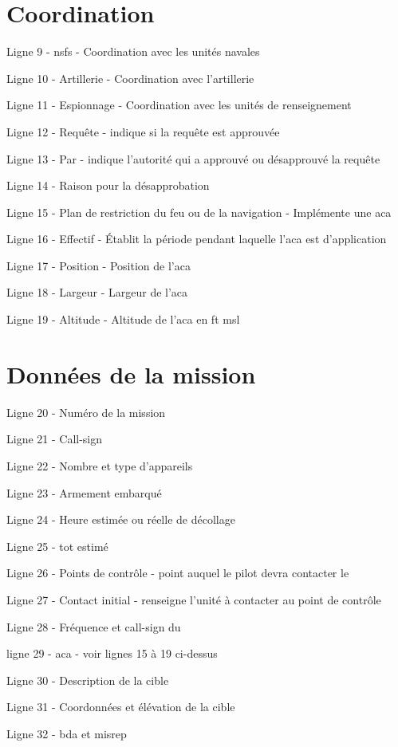 \begin{e2}
\section{Coordination}

	\item Ligne 9 - \gls{nsfs} - Coordination avec les unités navales
	\item Ligne 10 - Artillerie - Coordination avec l'artillerie
	\item Ligne 11 - Espionnage - Coordination avec les unités de renseignement
	\item Ligne 12 - Requête -  indique si la requête est approuvée
	\item Ligne 13 - Par - indique l'autorité qui a approuvé ou désapprouvé la requête
	\item Ligne 14 - Raison pour la désapprobation
	\item Ligne 15 - Plan de restriction du feu ou de la navigation - Implémente une \gls{aca}
	\item Ligne 16 - Effectif - Établit la période pendant laquelle l'\gls{aca} est d'application
	\item Ligne 17 - Position - Position de l'\gls{aca}
	\item Ligne 18 - Largeur - Largeur de l'\gls{aca}
	\item Ligne 19 - Altitude - Altitude de l'\gls{aca} en \gls{ft} \gls{msl}
	
\section{Données de la mission}

	\item Ligne 20 - Numéro de la mission
	\item Ligne 21 - Call-sign
	\item Ligne 22 - Nombre et type d'appareils
	\item Ligne 23 - Armement embarqué
	\item Ligne 24 - Heure estimée ou réelle de décollage
	\item Ligne 25 - \gls{tot} estimé
	\item Ligne 26 - Points de contrôle - point auquel le pilot devra contacter le \ja{}
	\item Ligne 27 - Contact initial - renseigne l'unité à contacter au point de contrôle
	\item Ligne 28 - Fréquence et call-sign du \ja{}
	\item ligne 29 - \gls{aca} - voir lignes 15 à 19 ci-dessus
	\item Ligne 30 - Description de la cible
	\item Ligne 31 - Coordonnées et élévation de la cible
	\item Ligne 32 - \gls{bda} et \gls{misrep}
\end{e2}

\newpage

\fancyhf{}
\renewcommand{\headrulewidth}{0pt}%
\renewcommand{\footrulewidth}{0pt}%


